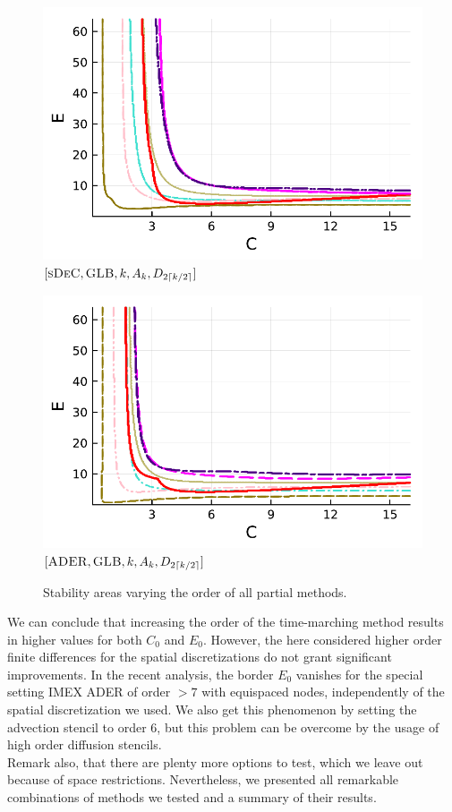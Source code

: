\begin{figure}[!h]
\begin{minipage}[t]{0.32\textwidth}
		\includegraphics[width=\textwidth]{pdf/pdepics/diff/IMEXDeC_subtimesteps_gaussLobatto_all_2-8.pdf}
		\centering
		$[\textsc{sDeC},\textsc{GLB}, k, A_k,D_{2\lceil k/2 \rceil}]$
	\end{minipage}
	\begin{minipage}[t]{0.32\textwidth}
		\includegraphics[width=\textwidth]{pdf/pdepics/diff/IMEXADER_gaussLobatto_all_2-8.pdf}
		\centering
		$[\textsc{ADER},\textsc{GLB}, k, A_k,D_{2\lceil k/2 \rceil}]$
	\end{minipage}	
	\caption{Stability areas varying the order of all partial methods.}
	\label{fig: exa_difftermsim}
\end{figure}

We can conclude that increasing the order of the time-marching method results in higher values for both $C_0$ and $E_0$. However, the here considered higher order finite differences for the spatial discretizations do not grant significant improvements. In the recent analysis, the border $E_0$ vanishes for the special setting IMEX ADER of order $>7$  with equispaced nodes, independently of the spatial discretization we used. We also get this phenomenon by setting the advection stencil to order 6, but this problem can be overcome by the usage of high order diffusion stencils.\\
Remark also, that there are plenty more options to test, which we leave out because of space restrictions. Nevertheless, we presented all remarkable combinations of methods we tested and a summary of their results.

